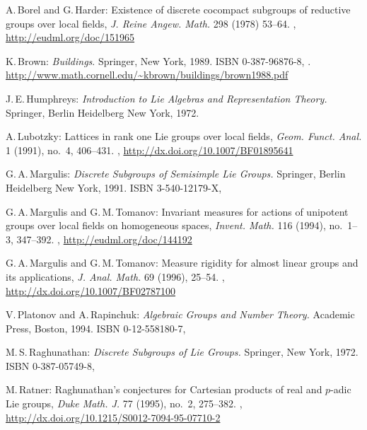\begin{references}{99}


 A.\,Borel and G.\,Harder:
 Existence of discrete cocompact subgroups of reductive
groups over local fields,
 \emph{J. Reine Angew. Math.} 298 (1978) 53--64.
 ,
 \maynewline
 \url{http://eudml.org/doc/151965}

K.\,Brown: 
\emph{Buildings}. 
Springer, New York, 1989. 
ISBN 0-387-96876-8,
.
\url{http://www.math.cornell.edu/~kbrown/buildings/brown1988.pdf}

 J.\,E.\,Humphreys:
 \emph{Introduction to Lie Algebras and Representation
Theory.}
 Springer, {Berlin Heidelberg New York}, 1972.

 A.\,Lubotzky:
 Lattices in rank one Lie groups over local fields,
 \emph{Geom. Funct. Anal.} 1 (1991), no.~4, 406--431.
,
\maynewline
\url{http://dx.doi.org/10.1007/BF01895641}

 G.\,A.\,Margulis:
 \emph{Discrete Subgroups of Semisimple Lie Groups.}
 Springer, {Berlin Heidelberg New York}, 1991.
 ISBN 3-540-12179-X,

G.\,A.\,Margulis and G.\,M.\,Tomanov:
Invariant measures for actions of unipotent groups over local fields on homogeneous spaces,
\emph{Invent. Math.}  116  (1994),  no.~1--3, 347--392.
 ,
\maynewline
\url{http://eudml.org/doc/144192}
 
G.\,A.\,Margulis and G.\,M.\,Tomanov:
Measure rigidity for almost linear groups and its applications,
\emph{J. Anal. Math.}  69  (1996), 25--54.
 ,
 \maynewline
 \url{http://dx.doi.org/10.1007/BF02787100}

 V.\,Platonov and A.\,Rapinchuk: 
 \emph{Algebraic Groups and Number Theory.}
 Academic Press, Boston, 1994.
 ISBN 0-12-558180-7,

 M.\,S.\,Raghunathan: 
 \emph{Discrete Subgroups of Lie Groups.}
 Springer, {New York}, 1972.
 ISBN 0-387-05749-8,

M.\,Ratner:
Raghunathan's conjectures for Cartesian products of real and $p$-adic Lie groups,
\emph{Duke Math. J.} 77 (1995), no.~2, 275--382. 
,
\maynewline
\url{http://dx.doi.org/10.1215/S0012-7094-95-07710-2}


\end{references}
